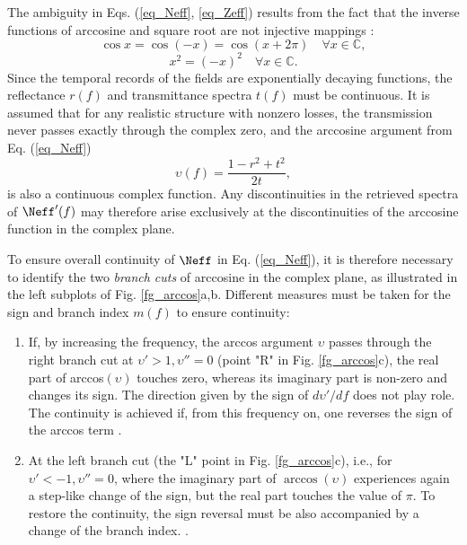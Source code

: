 The ambiguity in Eqs. (\ref{eq_Neff}, \ref{eq_Zeff}) results from the fact that the inverse functions of arccosine and square root are not injective mappings \cite{simovski2009material}:
\begin{equation} \cos x = \cos (-x) = \cos(x+2\pi) \quad  \forall x\in\mathbb{C}, \label{eq_noninjN}\end{equation}
\begin{equation} x^2 = (-x)^2 \quad \forall x\in\mathbb{C}. \label{eq_noninjZ}\end{equation}
Since the temporal records of the fields are exponentially decaying functions, the reflectance  $r(f)$ and transmittance spectra $t(f)$ must be continuous. 
It is assumed that for any realistic structure with nonzero losses, the transmission never passes exactly through the complex zero, and the arccosine argument from Eq. (\ref{eq_Neff})
\begin{equation} \upsilon(f) = \frac{1-r^2+t^2}{2t},   \label{eq_upsilon}\end{equation}
is also a continuous complex function. Any discontinuities in the retrieved spectra of $\Neff'(f)$ may therefore arise exclusively at the discontinuities of the arccosine function in the complex plane.

To ensure overall continuity of $\Neff$ in Eq. (\ref{eq_Neff}), it is therefore necessary to identify the two \textit{branch cuts} of arccosine in the complex plane, as illustrated in the left subplots of Fig. \ref{fg_arccos}a,b. Different measures must be taken for the sign and branch index $m(f)$ to ensure continuity:
\begin{enumerate}
\item{
If, by increasing the frequency, the arccos argument $\upsilon$ passes through the right branch cut at $\upsilon' > 1, \upsilon'' = 0$ (point "R" in Fig. \ref{fg_arccos}c), the real part of arccos$(\upsilon)$ touches zero, whereas its imaginary part is non-zero and changes its sign. The direction given by the sign of $d\upsilon'/df$ does not play role. The continuity is achieved if, from this frequency on, one reverses the sign of the arccos term . 
} 
\item{
		At the left branch cut (the "L" point in Fig. \ref{fg_arccos}c), i.e., for $\upsilon' < -1, \upsilon''=0$, where the imaginary part of $\arccos(\upsilon)$ experiences again a step-like change of the sign, but the real part touches the value of $\pi$. To restore the continuity, the sign reversal must be also accompanied by a change of the branch index. . 
} 
 \end{enumerate}

